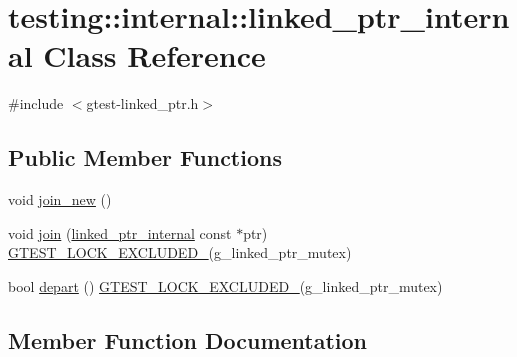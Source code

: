 \hypertarget{classtesting_1_1internal_1_1linked__ptr__internal}{}\section{testing\+:\+:internal\+:\+:linked\+\_\+ptr\+\_\+internal Class Reference}
\label{classtesting_1_1internal_1_1linked__ptr__internal}


{\ttfamily \#include $<$gtest-\/linked\+\_\+ptr.\+h$>$}

\subsection*{Public Member Functions}
\begin{DoxyCompactItemize}
\item 
void \hyperlink{classtesting_1_1internal_1_1linked__ptr__internal_a742af1f65df2d5e2b7198a1b74264a83}{join\+\_\+new} ()
\item 
void \hyperlink{classtesting_1_1internal_1_1linked__ptr__internal_acd5a341459f7e81b10b4112d8c764e2a}{join} (\hyperlink{classtesting_1_1internal_1_1linked__ptr__internal}{linked\+\_\+ptr\+\_\+internal} const $\ast$ptr) \hyperlink{gtest-port_8h_a69abff5a4efdd07bd5faebe3dd318d06}{G\+T\+E\+S\+T\+\_\+\+L\+O\+C\+K\+\_\+\+E\+X\+C\+L\+U\+D\+E\+D\+\_\+}(g\+\_\+linked\+\_\+ptr\+\_\+mutex)
\item 
bool \hyperlink{classtesting_1_1internal_1_1linked__ptr__internal_a8699e539d9702d363ef0351012d1b3ca}{depart} () \hyperlink{gtest-port_8h_a69abff5a4efdd07bd5faebe3dd318d06}{G\+T\+E\+S\+T\+\_\+\+L\+O\+C\+K\+\_\+\+E\+X\+C\+L\+U\+D\+E\+D\+\_\+}(g\+\_\+linked\+\_\+ptr\+\_\+mutex)
\end{DoxyCompactItemize}


\subsection{Member Function Documentation}
